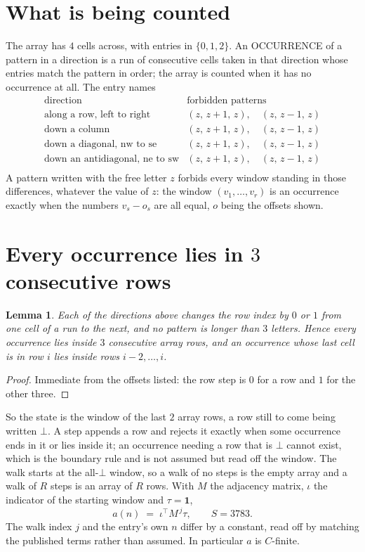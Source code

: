 \documentclass[11pt,a4paper]{article}
\theoremstyle{plain}
\newtheorem{lemma}[theorem]{Lemma}
\theoremstyle{definition}
\begin{document}
\section{What is being counted}

The array has $4$ cells across, with entries in $\{0,1,2\}$. An OCCURRENCE of a pattern in a
direction is a run of consecutive cells taken in that direction whose entries match the pattern
in order; the array is counted when it has no occurrence at all. The entry names
\[
\begin{array}{ll}
\text{direction} & \text{forbidden patterns} \\[2pt]
\text{along a row, left to right} & (z,\,z+1,\,z),\quad (z,\,z-1,\,z) \\
\text{down a column} & (z,\,z+1,\,z),\quad (z,\,z-1,\,z) \\
\text{down a diagonal, nw to se} & (z,\,z+1,\,z),\quad (z,\,z-1,\,z) \\
\text{down an antidiagonal, ne to sw} & (z,\,z+1,\,z),\quad (z,\,z-1,\,z) \\
\end{array}
\]
 A pattern written with the free letter $z$ forbids every window standing in those differences, whatever the value of $z$: the window $(v_1,\dots,v_r)$ is an occurrence exactly when the numbers $v_s-o_s$ are all equal, $o$ being the offsets shown.

\section{Every occurrence lies in $3$ consecutive rows}

\begin{lemma}\label{lem:win}
Each of the directions above changes the row index by $0$ or $1$ from one cell of a run to the
next, and no pattern is longer than $3$ letters. Hence every occurrence lies inside $3$
consecutive array rows, and an occurrence whose last cell is in row $i$ lies inside rows
$i-2,\dots,i$.
\end{lemma}

\begin{proof}
Immediate from the offsets listed: the row step is $0$ for a row and $1$ for the other three.
\end{proof}

So the state is the window of the last $2$ array rows, a row still to come being written
$\bot$. A step appends a row and rejects it exactly when some occurrence ends in it or lies
inside it; an occurrence needing a row that is $\bot$ cannot exist, which is the boundary rule
and is not assumed but read off the window. The walk starts at the all-$\bot$ window, so a walk
of no steps is the empty array and a walk of $R$ steps is an array of $R$ rows. With $M$ the
adjacency matrix, $\iota$ the indicator of the starting window and $\tau=\mathbf{1}$,
\[
a(n)\;=\;\iota^{\!\top}M^{\,j}\tau ,\qquad S=3783.
\]
The walk index $j$ and the entry's own $n$ differ by a constant, read off by matching the
published terms rather than assumed. In particular $a$ is $C$-finite.
\end{document}
